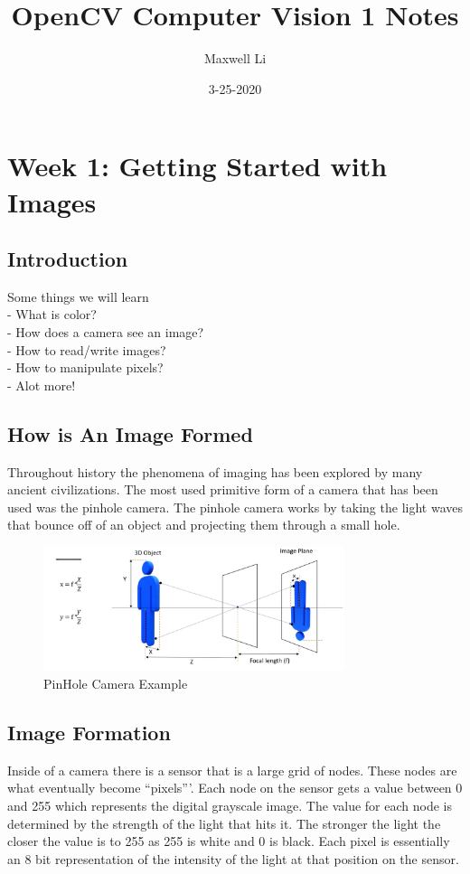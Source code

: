\documentclass[fleqn]{article}
\title{OpenCV Computer Vision 1 Notes}
\date{3-25-2020}
\author{Maxwell Li}
\begin{document}
  \color{black!20!white}
  \pagecolor{black!80!white}
  \maketitle
  \tableofcontents
  \setcounter{secnumdepth}{0}
  \newpage

  \section{\textbf{Week 1: Getting Started with Images}}
    \subsection{Introduction}
    Some things we will learn\\
    \quad - What is color?\\
    \quad - How does a camera see an image?\\
    \quad - How to read/write images?\\
    \quad - How to manipulate pixels?\\
    \quad - Alot more!

    \subsection{How is An Image Formed}
    Throughout history the phenomena of imaging has been explored by many ancient civilizations. The most used primitive form of a camera that has been used was the pinhole camera. The pinhole camera works by taking the light waves that bounce off of an object and projecting them through a small hole.

    \begin{figure}[h]
      \centering
      \includegraphics[width = 250pt]{pinholecamera.png}
      \caption{PinHole Camera Example}
      \label{fig: Pinhole Camera}
    \end{figure}


    \subsection{Image Formation}
    Inside of a camera there is a sensor that is a large grid of nodes. These nodes are what eventually become ``pixels'''. Each node on the sensor gets a value between 0 and 255 which represents the digital grayscale image. The value for each node is determined by the strength of the light that hits it. The stronger the light the closer the value is to 255 as 255 is white and 0 is black. Each pixel is essentially an 8 bit representation of the intensity of the light at that position on the sensor.
\end{document}
